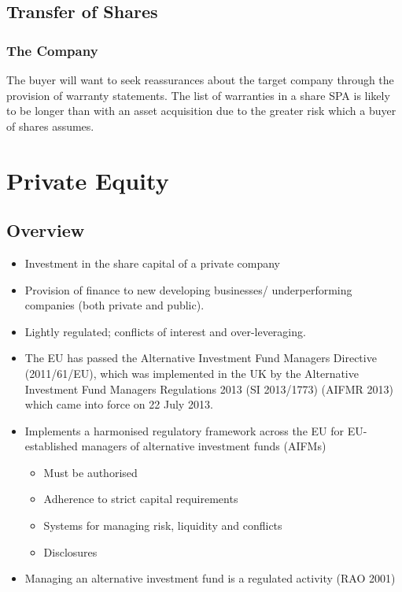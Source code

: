 \documentclass[
]{article}
\providecommand{\tightlist}{%
  \setlength{\itemsep}{0pt}\setlength{\parskip}{0pt}}
\begin{document}
\hypertarget{transfer-of-shares}{%
\subsection{Transfer of Shares}\label{transfer-of-shares}}

\hypertarget{the-company}{%
\subsubsection{The Company}\label{the-company}}

The buyer will want to seek reassurances about the target company
through the provision of warranty statements. The list of warranties in
a share SPA is likely to be longer than with an asset acquisition due to
the greater risk which a buyer of shares assumes.

\hypertarget{private-equity}{%
\section{Private Equity}\label{private-equity}}

\hypertarget{overview}{%
\subsection{Overview}\label{overview}}

\begin{itemize}
\tightlist
\item
  Investment in the share capital of a private company
\item
  Provision of finance to new developing businesses/ underperforming
  companies (both private and public).
\item
  Lightly regulated; conflicts of interest and over-leveraging.
\item
  The EU has passed the Alternative Investment Fund Managers Directive
  (2011/61/EU), which was implemented in the UK by the Alternative
  Investment Fund Managers Regulations 2013 (SI 2013/1773) (AIFMR 2013)
  which came into force on 22 July 2013.
\item
  Implements a harmonised regulatory framework across the EU for
  EU-established managers of alternative investment funds (AIFMs)

  \begin{itemize}
  \tightlist
  \item
    Must be authorised
  \item
    Adherence to strict capital requirements
  \item
    Systems for managing risk, liquidity and conflicts
  \item
    Disclosures
  \end{itemize}
\item
  Managing an alternative investment fund is a regulated activity (RAO
  2001)
\end{itemize}
\end{document}
